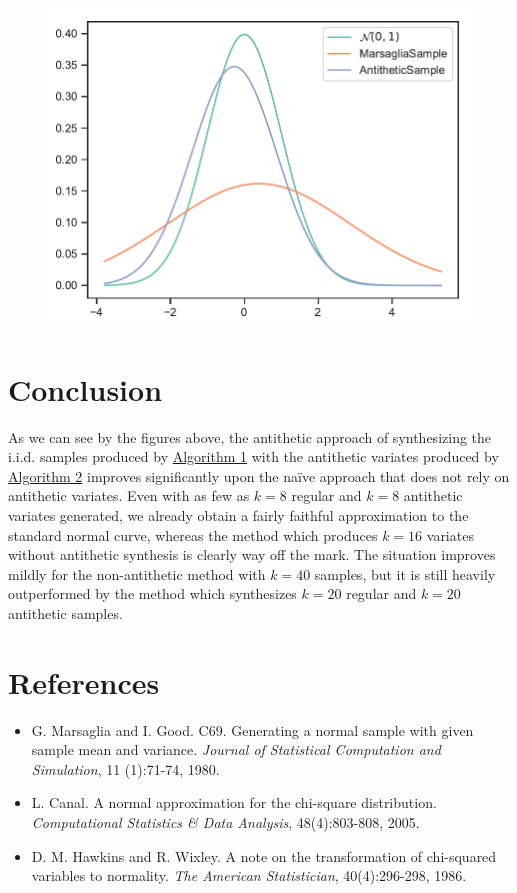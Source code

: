 \documentclass[12pt, a4paper]{article}
\begin{document}
\begin{figure}[H]
\begin{minipage}{\textwidth}
        \includegraphics[scale=1]{../figures/normal-k20.pdf}
    \end{minipage}
\end{figure}

\section{Conclusion} \label{sec:5}
As we can see by the figures above, the antithetic approach of synthesizing the i.i.d. samples produced by \hyperref[alg:marsaglia]{Algorithm 1}
with the antithetic variates produced by \hyperref[alg:antithetic]{Algorithm 2} improves significantly upon the na\"ive approach that does not rely on antithetic variates.
Even with as few as $k = 8$ regular and $k = 8$ antithetic variates generated, we already obtain a fairly faithful approximation to the standard normal curve,
whereas the method which produces $k = 16$ variates without antithetic synthesis is clearly way off the mark.
The situation improves mildly for the non-antithetic method with $k = 40$ samples, but it is still heavily outperformed by the method
which synthesizes $k = 20$ regular and $k = 20$ antithetic samples.

\section*{References} \label{sec:ref}

\begin{itemize}
    \item \label{ref:marsaglia}
        G. Marsaglia and I. Good. C69. Generating a normal sample with given sample mean and variance.
        {\it Journal of Statistical Computation and Simulation}, 11 (1):71-74, 1980.
    \item \label{ref:canal}
        L. Canal. A normal approximation for the chi-square distribution. {\it Computational Statistics \& Data Analysis}, 48(4):803-808, 2005.
    \item \label{ref:hawkins}
        D. M. Hawkins and R. Wixley. A note on the transformation of chi-squared variables to normality. {\it The American Statistician}, 40(4):296-298, 1986.
\end{itemize}
\end{document}
